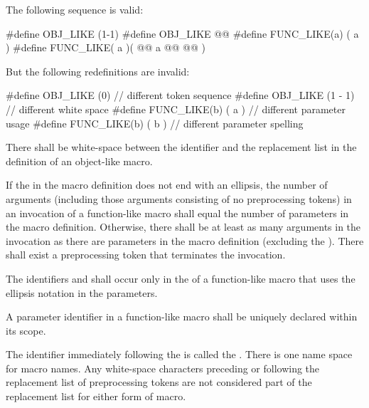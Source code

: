 \pnum
\begin{example}
The following sequence is valid:
\begin{codeblock}
#define OBJ_LIKE      (1-1)
#define OBJ_LIKE      @@
#define FUNC_LIKE(a)   ( a )
#define FUNC_LIKE( a )(     @@
                a @@
                  @\tcode{*/}@ )
\end{codeblock}
But the following redefinitions are invalid:
\begin{codeblock}
#define OBJ_LIKE    (0)         // different token sequence
#define OBJ_LIKE    (1 - 1)     // different white space
#define FUNC_LIKE(b) ( a )      // different parameter usage
#define FUNC_LIKE(b) ( b )      // different parameter spelling
\end{codeblock}
\end{example}

\pnum
{}%
There shall be white-space between the identifier and the replacement list
in the definition of an object-like macro.

\pnum
If the  in the macro definition does not end with
an ellipsis, the number of arguments (including those arguments consisting
of no preprocessing tokens)
in an invocation of a function-like macro shall
equal the number of parameters in the macro definition.
Otherwise, there shall be at least as many arguments in the invocation as there are
parameters in the macro definition (excluding the ). There
shall exist a
\tcode{)}
preprocessing token that terminates the invocation.

\pnum
{}%
%
The identifiers  and 
shall occur only in the 
of a function-like macro that uses the ellipsis notation in the parameters.

\pnum
A parameter identifier in a function-like macro
shall be uniquely declared within its scope.

\pnum
The identifier immediately following the
is called the
%
.
There is one name space for macro names.
Any white-space characters preceding or following the
replacement list of preprocessing tokens are not considered
part of the replacement list for either form of macro.

